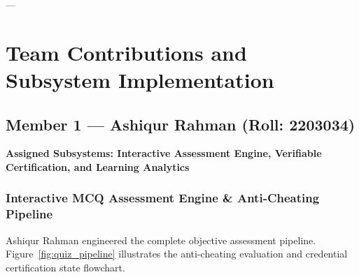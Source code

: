 \documentclass[12pt,a4paper]{report}
\begin{document}
---

\chapter{Team Contributions and Subsystem Implementation}

\section{Member 1 — Ashiqur Rahman (Roll: 2203034)}
\textbf{Assigned Subsystems: Interactive Assessment Engine, Verifiable Certification, and Learning Analytics}

\subsection{Interactive MCQ Assessment Engine \& Anti-Cheating Pipeline}
Ashiqur Rahman engineered the complete objective assessment pipeline. Figure~\ref{fig:quiz_pipeline} illustrates the anti-cheating evaluation and credential certification state flowchart.
\end{document}
